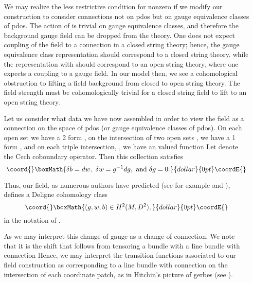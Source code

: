 \documentclass[a4paper,11pt]{amsart}
\begin{document}
We may realize the less restrictive condition \coordHE{} for 
nonzero \coordHE{} if we modify our construction to consider connections not 
on pdos but on gauge equivalence classes of pdos. The action of
 \coordHE{} is trivial on gauge equivalence
classes, and therefore the background gauge field can be dropped from the theory.
One does not expect coupling of the \coordHE{} field to a connection in a closed string
theory; hence, the gauge equivalence class representation should correspond to a
closed string theory, while the representation with \coordHE{} should 
correspond to an open string theory, where one expects a coupling to a gauge
field. In our model then, we see a cohomological obstruction to lifting a \coordHE{}
field background from closed to open string theory. The field strength \coordHE{} 
must be cohomologically trivial for a closed string \coordHE{} field to lift to an open
string theory.

Let us consider what data we have now assembled in order to view 
the \coordHE{} field as a connection on the space of pdos (or gauge equivalence
classes of pdos). On each open set \coordHE{} we have a 2 form \coordHE{}, 
on the intersection of two open sets \coordHE{}, 
we have a 1 form \coordHE{}, and on each triple intersection,
\coordHE{}, we have 
an \coordHE{} valued function \coordHE{} Let \myHighlight{$\delta$}\coordHE{} denote the 
Cech coboundary operator. Then this collection satisfies 
$$\coord{}\boxMath{\delta b = d w, \mbox{   }\delta w = g^{-1}dg, \mbox{  and  } \delta g = 0.}{dollar}{0pt}\coordE{}$$

Thus, our \coordHE{} field, as numerous authors have predicted (see for example 
 \cite{FW} and \cite{KO}), defines a Deligne cohomology class 
$$\coord{}\boxMath{(g,w,b)\in H^2(M,D^2),}{dollar}{0pt}\coordE{}$$
in the notation of \cite{CJM}. 
  
      As \coordHE{} 
 we may interpret this change of gauge as 
a change of connection.  We note that it is the shift that
  follows from tensoring a bundle with a line bundle with connection 
  \coordHE{}  
  Hence, we may interpret the transition functions associated to our \coordHE{} field 
  construction as corresponding to 
a line bundle with connection on the intersection of each coordinate patch,
 as in Hitchin's picture of gerbes (see \cite{H}). 
 
\end{document}
